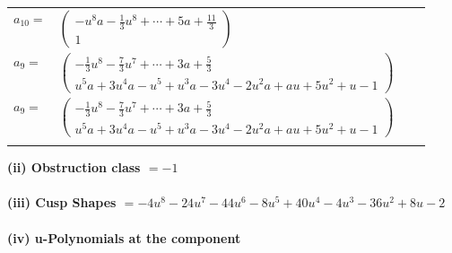 \documentclass[1p]{elsarticle_modified}
\theoremstyle{definition}
\begin{document}
\begin{tabular}{m{7pt} m{180pt} m{7pt} m{180pt} }
\flushright $a_{10}=$&$\begin{pmatrix}- u^8 a-\frac{1}{3} u^8+\cdots+5 a+\frac{11}{3}\\1\end{pmatrix}$ \\
\flushright $a_{9}=$&$\begin{pmatrix}-\frac{1}{3} u^8-\frac{7}{3} u^7+\cdots+3 a+\frac{5}{3}\\u^5 a+3 u^4 a- u^5+u^3 a-3 u^4-2 u^2 a+a u+5 u^2+u-1\end{pmatrix}$\\ \flushright $a_{9}=$&$\begin{pmatrix}-\frac{1}{3} u^8-\frac{7}{3} u^7+\cdots+3 a+\frac{5}{3}\\u^5 a+3 u^4 a- u^5+u^3 a-3 u^4-2 u^2 a+a u+5 u^2+u-1\end{pmatrix}$\\&\end{tabular}
\flushleft \textbf{(ii) Obstruction class $= -1$}\\~\\
\flushleft \textbf{(iii) Cusp Shapes $= -4 u^8-24 u^7-44 u^6-8 u^5+40 u^4-4 u^3-36 u^2+8 u-2$}\\~\\
\newpage\renewcommand{\arraystretch}{1}
\flushleft \textbf{(iv) u-Polynomials at the component}\newline \\
\end{document}
